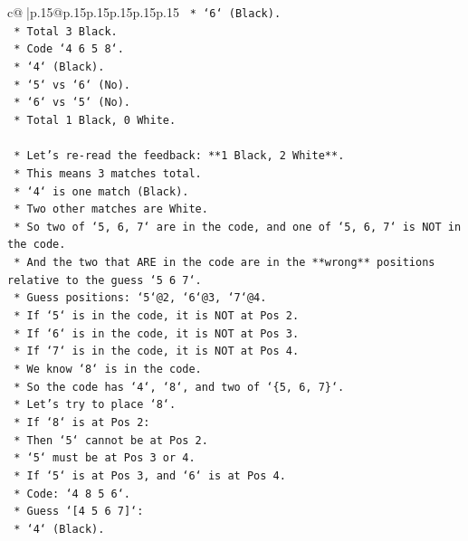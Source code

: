 \documentclass{article}
\begin{document}
{\begin{supertabular}{c@{$\;$}|p{.15\linewidth}@{}p{.15\linewidth}p{.15\linewidth}p{.15\linewidth}p{.15\linewidth}p{.15\linewidth}}
{{{\texttt{            *   `6` (Black).} \\
\texttt{            *   Total 3 Black.} \\
\texttt{        *   Code `4 6 5 8`.} \\
\texttt{            *   `4` (Black).} \\
\texttt{            *   `5` vs `6` (No).} \\
\texttt{            *   `6` vs `5` (No).} \\
\texttt{            *   Total 1 Black, 0 White.} \\
\\ 
\texttt{    *   Let's re{-}read the feedback: **1 Black, 2 White**.} \\
\texttt{    *   This means 3 matches total.} \\
\texttt{    *   `4` is one match (Black).} \\
\texttt{    *   Two other matches are White.} \\
\texttt{    *   So two of `5, 6, 7` are in the code, and one of `5, 6, 7` is NOT in the code.} \\
\texttt{    *   And the two that ARE in the code are in the **wrong** positions relative to the guess `5 6 7`.} \\
\texttt{    *   Guess positions: `5`@2, `6`@3, `7`@4.} \\
\texttt{    *   If `5` is in the code, it is NOT at Pos 2.} \\
\texttt{    *   If `6` is in the code, it is NOT at Pos 3.} \\
\texttt{    *   If `7` is in the code, it is NOT at Pos 4.} \\
\texttt{    *   We know `8` is in the code.} \\
\texttt{    *   So the code has `4`, `8`, and two of `\{5, 6, 7\}`.} \\
\texttt{    *   Let's try to place `8`.} \\
\texttt{        *   If `8` is at Pos 2:} \\
\texttt{            *   Then `5` cannot be at Pos 2.} \\
\texttt{            *   `5` must be at Pos 3 or 4.} \\
\texttt{            *   If `5` is at Pos 3, and `6` is at Pos 4.} \\
\texttt{            *   Code: `4 8 5 6`.} \\
\texttt{            *   Guess `{[}4 5 6 7{]}`:} \\
\texttt{                *   `4` (Black).} \\
}}}
\end{supertabular}}
\end{document}
